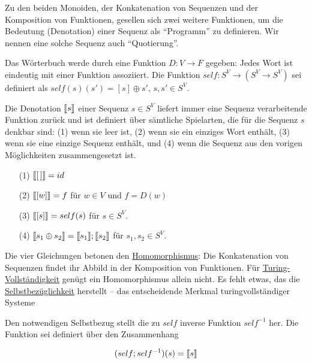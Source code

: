 Zu den beiden Monoiden, der Konkatenation von Sequenzen und der Komposition von Funktionen, gesellen sich zwei weitere Funktionen, um die Bedeutung (Denotation) einer Sequenz als "`Programm"' zu definieren. Wir nennen eine solche Sequenz auch "`Quotierung"'.

Das Wörterbuch werde durch eine Funktion $D:V\rightarrow F$ gegeben: Jedes Wort ist eindeutig mit einer Funktion assoziiert. 
Die Funktion $self:S^V\rightarrow (S^V\rightarrow S^V)$ sei definiert als $self(s)(s')=[s]\oplus s'$, $s, s'\in S^V$.

Die Denotation $[\hspace{-1.5pt}[ s ]\hspace{-1.5pt}]$ einer Sequenz $s\in S^V$
liefert immer eine Sequenz verarbeitende Funktion zurück und
ist definiert über sämtliche Spielarten, die für die Sequenz $s$ denkbar sind: (1) wenn sie leer ist, (2) wenn sie ein einziges Wort enthält, (3) wenn sie eine einzige Sequenz enthält, und (4) wenn die Sequenz aus den vorigen Möglichkeiten zusammengesetzt ist.

\begin{enumerate}
\item[(1)] $[\hspace{-1.5pt}[ [\,] ]\hspace{-1.5pt}] = id$
\item[(2)] $[\hspace{-1.5pt}[ [ w] ]\hspace{-1.5pt}] = f$ für $w\in V$ und $f=D(w)$
\item[(3)] $[\hspace{-1.5pt}[ [ s] ]\hspace{-1.5pt}] = self(s)$ für $s\in S^V$.
\item[(4)] $[\hspace{-1.5pt}[ s_1\oplus s_2 ]\hspace{-1.5pt}] =
       [\hspace{-1.5pt}[ s_1 ]\hspace{-1.5pt}] ; [\hspace{-1.5pt}[ s_2 ]\hspace{-1.5pt}]$ für $s_1,s_2\in S^V$.
\end{enumerate}

Die vier Gleichungen betonen den \href{http://de.wikipedia.org/wiki/Homomorphismus}{Homomorphismus}: Die Konkatenation von Sequenzen findet ihr Abbild in der Komposition von Funktionen. Für \href{http://de.wikipedia.org/wiki/Turing-Vollst\%C3\%A4ndigkeit}{Turing-Vollständigkeit} genügt ein Homomorphismus allein nicht. Es fehlt etwas, das die \href{http://de.wikipedia.org/wiki/Selbstbez\%C3\%BCglichkeit}{Selbstbezüglichkeit} herstellt -- das entscheidende Merkmal turingvollständiger Systeme

Den notwendigen Selbstbezug stellt die zu $self$ inverse Funktion $self^{-1}$ her. Die Funktion sei
definiert über den Zusammenhang

$$(self;self^{-1})(s) = [\hspace{-1.5pt}[ s ]\hspace{-1.5pt}]$$



